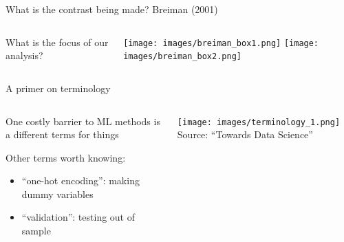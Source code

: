 \documentclass[notes,11pt, aspectratio=169]{beamer}
\newenvironment{wideitemize}{\itemize\addtolength{\itemsep}{10pt}}{\enditemize}
\begin{document}
\begin{frame}{What is the contrast being made? Breiman (2001)}
    \begin{columns}[onlytextwidth, T] %
      \begin{column}{.5\textwidth}
        \begin{wideitemize}
          \item What is the focus of our analysis?
        \end{wideitemize}
      \end{column}%
      \hfill%
      \begin{column}{.5\textwidth}
        \texttt{[image: images/breiman\_box1.png]}
        \texttt{[image: images/breiman\_box2.png]}        
      \end{column}%
    \end{columns}
\end{frame}


\begin{frame}{A primer on terminology}
    \begin{columns}[onlytextwidth, T] %
      \begin{column}{.5\textwidth}
        \begin{wideitemize}
        \item One costly barrier to ML methods is a different terms for things
        \item Other terms worth knowing:
          \begin{itemize}
          \item ``one-hot encoding'': making dummy variables
          \item ``validation'': testing out of sample
          \end{itemize}
        \end{wideitemize}
      \end{column}%
      \hfill%
      \begin{column}{.5\textwidth}
        \texttt{[image: images/terminology\_1.png]}
        Source: ``Towards Data Science''
      \end{column}%
    \end{columns}
\end{frame}
\end{document}
